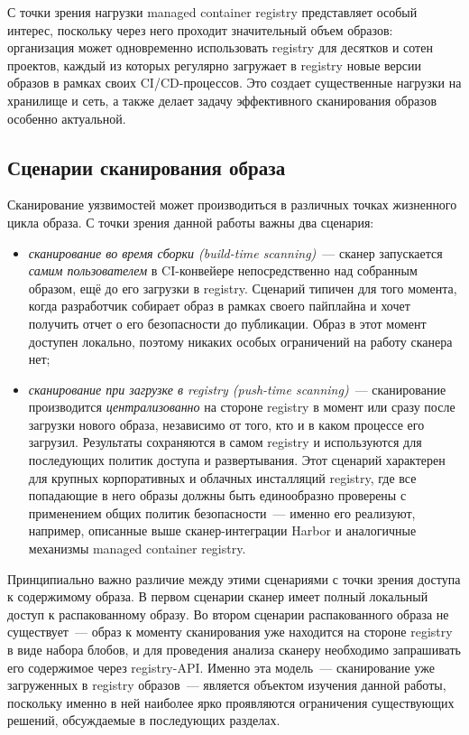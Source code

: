 С точки зрения нагрузки managed container registry представляет особый интерес, поскольку через него проходит значительный объем образов: организация может одновременно использовать registry для десятков и сотен проектов, каждый из которых регулярно загружает в registry новые версии образов в рамках своих CI/CD-процессов. Это создает существенные нагрузки на хранилище и сеть, а также делает задачу эффективного сканирования образов особенно актуальной.

\subsection{Сценарии сканирования образа}
\label{subsec:scan-lifecycle}

Сканирование уязвимостей может производиться в различных точках жизненного цикла образа. С точки зрения данной работы важны два сценария:

\begin{itemize}
\item \textit{сканирование во время сборки (build-time scanning)}~--- сканер запускается \textit{самим пользователем} в CI-конвейере непосредственно над собранным образом, ещё до его загрузки в registry. Сценарий типичен для того момента, когда разработчик собирает образ в рамках своего пайплайна и хочет получить отчет о его безопасности до публикации. Образ в этот момент доступен локально, поэтому никаких особых ограничений на работу сканера нет;
\item \textit{сканирование при загрузке в registry (push-time scanning)}~--- сканирование производится \textit{централизованно} на стороне registry в момент или сразу после загрузки нового образа, независимо от того, кто и в каком процессе его загрузил. Результаты сохраняются в самом registry и используются для последующих политик доступа и развертывания. Этот сценарий характерен для крупных корпоративных и облачных инсталляций registry, где все попадающие в него образы должны быть единообразно проверены с применением общих политик безопасности~--- именно его реализуют, например, описанные выше сканер-интеграции Harbor и аналогичные механизмы managed container registry.
\end{itemize}

Принципиально важно различие между этими сценариями с точки зрения доступа к содержимому образа. В первом сценарии сканер имеет полный локальный доступ к распакованному образу. Во втором сценарии распакованного образа не существует~--- образ к моменту сканирования уже находится на стороне registry в виде набора блобов, и для проведения анализа сканеру необходимо запрашивать его содержимое через registry-API. Именно эта модель~--- сканирование уже загруженных в registry образов~--- является объектом изучения данной работы, поскольку именно в ней наиболее ярко проявляются ограничения существующих решений, обсуждаемые в последующих разделах.

\newpage
